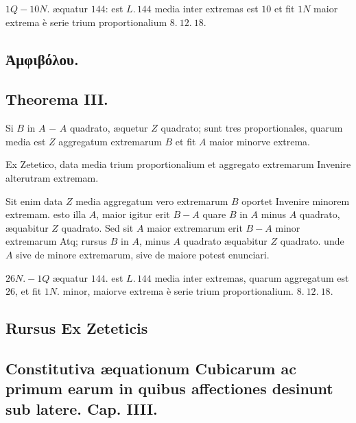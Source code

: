 \documentclass[11pt,a4paper]{article}
\begin{document}
$1Q - 10N.$ æquatur $144$: est $L.\,144$ media inter extremas  est $10$ et fit $1N$ maior extrema è serie trium proportionalium $8.\ 12.\ 18.$


\subsection*{Ἀμφιβόλου.}

\subsection*{Theorema III.}

Si $B$ in $A$ $-$ $A$ quadrato, æquetur $Z$ quadrato; sunt tres proportionales, quarum media est $Z$ aggregatum extremarum $B$ et fit $A$ maior minorve extrema.

Ex Zetetico, data media trium proportionalium et aggregato extremarum Invenire alterutram extremam.

Sit enim data $Z$ media aggregatum vero extremarum $B$ oportet Invenire minorem extremam. esto illa $A$, maior igitur erit $B - A$ quare $B$ in $A$ minus $A$ quadrato, æquabitur $Z$ quadrato. Sed sit $A$ maior extremarum erit $B - A$ minor extremarum Atq; rursus $B$ in $A$, minus $A$ quadrato æquabitur $Z$ quadrato. unde $A$ sive de minore extremarum, sive de maiore potest enunciari.

$26N. - 1Q$ æquatur $144$. est $L.\,144$ media inter extremas, quarum aggregatum est $26$, et fit $1N.$ minor, maiorve extrema è serie trium proportionalium. $8.\ 12.\ 18.$

\subsection*{Rursus Ex Zeteticis}

\subsection*{Constitutiva æquationum Cubicarum ac primum earum in quibus affectiones desinunt sub latere. Cap. IIII.}
\end{document}
